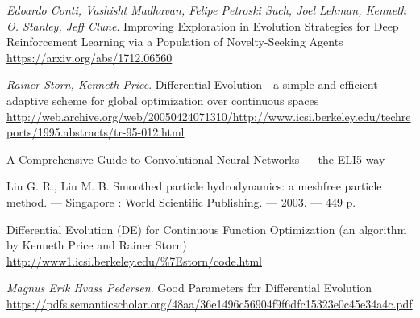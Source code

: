 \documentclass[12pt]{article}
\begin{document}
\newpage
{}
\begin{thebibliography}{}
    \emph{Edoardo Conti, Vashisht Madhavan, Felipe Petroski Such, Joel Lehman, Kenneth O. Stanley, Jeff Clune}.
    Improving Exploration in Evolution Strategies for Deep Reinforcement Learning via a Population of Novelty-Seeking Agents \\
    \url{https://arxiv.org/abs/1712.06560}
    
    \emph{Rainer Storn, Kenneth Price}. Differential Evolution - a simple and efficient adaptive scheme for global optimization over continuous spaces \\
    \url{http://web.archive.org/web/20050424071310/http://www.icsi.berkeley.edu/techreports/1995.abstracts/tr-95-012.html}

    A Comprehensive Guide to Convolutional Neural Networks — the ELI5 way

    Liu G. R., Liu M. B. Smoothed particle hydrodynamics: a meshfree particle method. --- Singapore : World Scientific Publishing. --- 2003. --- 449 p.

    Differential Evolution (DE) for Continuous Function Optimization (an algorithm by Kenneth Price and Rainer Storn) \\
    \url{http://www1.icsi.berkeley.edu/\%7Estorn/code.html}

    \emph{Magnus Erik Hvass Pedersen}. Good Parameters for Differential Evolution \\
    \url{https://pdfs.semanticscholar.org/48aa/36e1496c56904f9f6dfc15323e0c45e34a4c.pdf}


\end{thebibliography}
\end{document}
